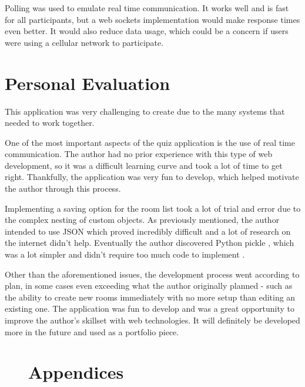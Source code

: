 \documentclass[10pt, a4paper]{article}
\begin{document}
	Polling was used to emulate real time communication. It works well and is fast for all participants, but a web sockets implementation would make response times even better. It would also reduce data usage, which could be a concern if users were using a cellular network to participate.
	
	\section{Personal Evaluation}
	This application was very challenging to create due to the many systems that needed to work together.
	
	One of the most important aspects of the quiz application is the use of real time communication. The author had no prior experience with this type of web development, so it was a difficult learning curve and took a lot of time to get right. Thankfully, the application was very fun to develop, which helped motivate the author through this process.
	
	Implementing a saving option for the room list took a lot of trial and error due to the complex nesting of custom objects. As previously mentioned, the author intended to use JSON which proved incredibly difficult and a lot of research on the internet didn't help. Eventually the author discovered Python pickle \cite{UsingPickle}, which was a lot simpler and didn't require too much code to implement \cite{PickleImplementation}.
	
	Other than the aforementioned issues, the development process went according to plan, in some cases even exceeding what the author originally planned - such as the ability to create new rooms immediately with no more setup than editing an existing one. The application was fun to develop and was a great opportunity to improve the author's skillset with web technologies. It will definitely be developed more in the future and used as a portfolio piece.
	



\begin{figure}
\section{Appendices}
\end{figure}
\end{document}
